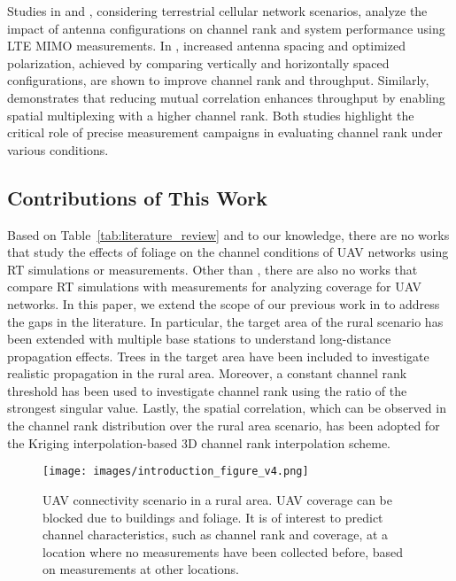 Studies in \cite{vertical_MIMO_paper} and \cite{vertical_MIMO_paper_2}, considering terrestrial cellular network scenarios, analyze the impact of antenna configurations on channel rank and system performance using LTE MIMO measurements. In \cite{vertical_MIMO_paper}, increased antenna spacing and optimized polarization, achieved by comparing vertically and horizontally spaced configurations, are shown to improve channel rank and throughput. Similarly, \cite{vertical_MIMO_paper_2} demonstrates that reducing mutual correlation enhances throughput by enabling spatial multiplexing with a higher channel rank. Both studies highlight the critical role of precise measurement campaigns in evaluating channel rank under various conditions.

\subsection{Contributions of This Work}

 Based on Table~\ref{tab:literature_review} and to our knowledge, there are no works that study the effects of foliage on the channel conditions of UAV networks using RT simulations or measurements. Other than \cite{RT_channel_modeling,RT_terahz_UAV}, there are also no works that compare RT simulations with measurements for analyzing coverage for UAV networks.  
In this paper, we extend the scope of our previous work in \cite{previous_work} to address the gaps in the literature. In particular, the target area of the rural scenario has been extended with multiple base stations to understand long-distance propagation effects. Trees in the target area have been included to investigate realistic propagation in the rural area. Moreover, a constant channel rank threshold has been used to investigate channel rank using the ratio of the strongest singular value. Lastly, the spatial correlation, which can be observed in the channel rank distribution over the rural area scenario, has been adopted for the Kriging interpolation-based 3D channel rank interpolation scheme.

     \begin{figure*}[t]
     \centering
     \texttt{[image: images/introduction\_figure\_v4.png]}
     \caption{UAV connectivity scenario in a rural area. UAV coverage can be blocked due to buildings and foliage. It is of interest to predict channel characteristics, such as channel rank and coverage, at a location where no measurements have been collected before, based on measurements at other locations.}     \label{fig:introduction_figure}
 \end{figure*}